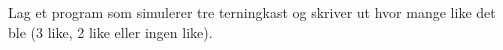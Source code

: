 %
%
Lag et program som simulerer tre terningkast og skriver ut hvor mange like det ble (3 like, 2 like eller ingen like).
